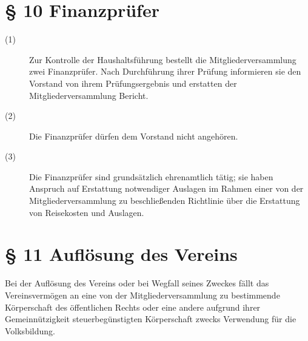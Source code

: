 \documentclass[12pt,paper=a4,ngerman]{scrreprt}
\begin{document}
\section{\S{} 10 Finanzprüfer}
\begin{description}
	\item[(1)] Zur Kontrolle der Haushaltsführung bestellt die Mitgliederversammlung zwei Finanzprüfer. Nach Durchführung ihrer Prüfung informieren sie den Vorstand von ihrem Prüfungsergebnis und erstatten der Mitgliederversammlung Bericht.
	\item[(2)] Die Finanzprüfer dürfen dem Vorstand nicht angehören.
	\item[(3)] Die Finanzprüfer sind grundsätzlich ehrenamtlich tätig; sie haben Anspruch auf Erstattung notwendiger Auslagen im Rahmen einer von der Mitgliederversammlung zu beschließenden Richtlinie über die Erstattung von Reisekosten und Auslagen.
\end{description}
\section{\S{} 11 Auflösung des Vereins}
Bei der Auflösung des Vereins oder bei Wegfall seines Zweckes fällt das Vereinsvermögen an eine von der Mitgliederversammlung zu bestimmende Körperschaft des öffentlichen Rechts oder eine andere aufgrund ihrer Gemeinnützigkeit steuerbegünstigten Körperschaft zwecks Verwendung für die Volksbildung.
\end{document}
